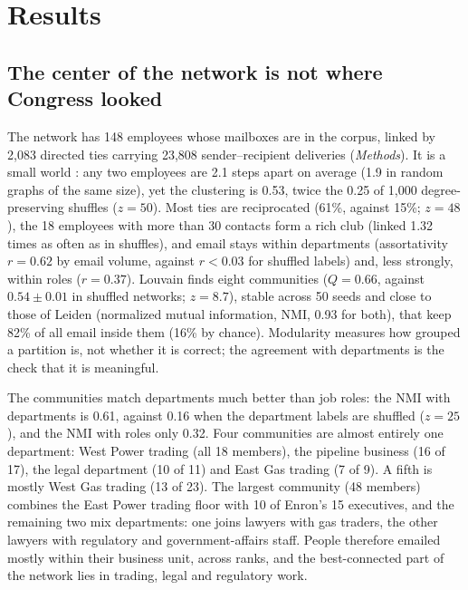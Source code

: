 \documentclass[9pt,twocolumn,twoside]{pnas-new}
\begin{document}
\section*{Results}

\subsection*{The center of the network is not where Congress looked}
The network has 148 employees whose mailboxes are in the corpus, linked by 2,083 directed
ties carrying 23,808 sender--recipient deliveries (\textit{Methods}). It is a small world
\cite{watts1998}: any two employees are 2.1 steps apart on average (1.9 in random graphs of
the same size), yet the clustering is 0.53, twice the 0.25 of 1,000 degree-preserving
shuffles \cite{maslov2002} ($z = 50$). Most ties are reciprocated (61\%, against 15\%;
$z = 48$), the 18 employees with more than 30 contacts form a rich club \cite{colizza2006}
(linked 1.32 times as often as in shuffles), and email stays within departments
(assortativity $r = 0.62$ by email volume, against $r < 0.03$ for shuffled labels)
\cite{newman2003} and, less strongly, within roles ($r = 0.37$). Louvain
\cite{blondel2008} finds eight communities ($Q = 0.66$, against $0.54 \pm 0.01$ in shuffled
networks; $z = 8.7$), stable across 50 seeds and close to those of Leiden \cite{traag2019}
(normalized mutual information, NMI, 0.93 for both), that keep 82\% of all email inside them
(16\% by chance). Modularity measures how grouped a partition is, not whether it is correct;
the agreement with departments is the check that it is meaningful.

The communities match departments much better than job roles: the NMI with departments is
0.61, against 0.16 when the department labels are shuffled ($z = 25$), and the NMI with roles
only 0.32. Four communities are almost entirely one department: West Power trading (all 18
members), the pipeline business (16 of 17), the legal department (10 of 11) and East Gas
trading (7 of 9). A fifth is mostly West Gas trading (13 of 23). The largest community
(48 members) combines the East Power trading floor with 10 of Enron's 15 executives, and the
remaining two mix departments: one joins lawyers with gas traders, the other lawyers with
regulatory and government-affairs staff. People therefore emailed mostly within their
business unit, across ranks, and the best-connected part of the network lies in trading,
legal and regulatory work.
\end{document}
